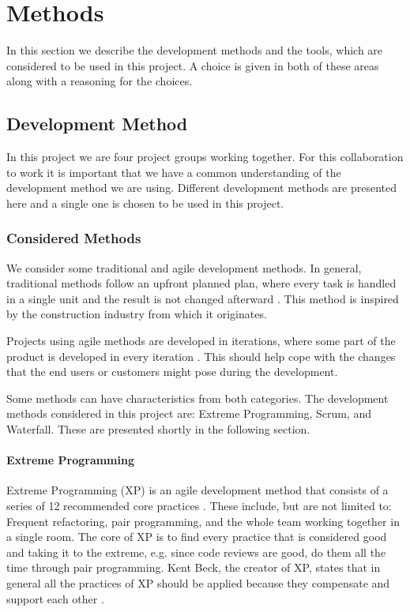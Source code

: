 \chapter{Methods}
In this section we describe the development methods and the tools, which are considered to be used in this project.
A choice is given in both of these areas along with a reasoning for the choices.

\section{Development Method}
\label{sec:devMethod}
In this project we are four project groups working together.
For this collaboration to work it is important that we have a common understanding of the development method we are using.
Different development methods are presented here and a single one is chosen to be used in this project.

\subsection{Considered Methods}
We consider some traditional and agile development methods. 
In general, traditional methods follow an upfront planned plan, where every task is handled in a single unit and the result is not changed afterward \cite[sec.~2.7]{Poppendieck00}.
This method is inspired by the construction industry from which it originates.

Projects using agile methods are developed in iterations, where some part of the product is developed in every iteration \cite[p.~25]{Larman04}.
This should help cope with the changes that the end users or customers might pose during the development.

Some methods can have characteristics from both categories.
The development methods considered in this project are: Extreme Programming, Scrum, and Waterfall.
These are presented shortly in the following section.

\subsubsection{Extreme Programming}
Extreme Programming (XP) is an agile development method that consists of a series of 12 recommended core practices \cite[p.~137]{Larman04}.
These include, but are not limited to: Frequent refactoring, pair programming, and the whole team working together in a single room.
The core of XP is to find every practice that is considered good and taking it to the extreme, e.g. since code reviews are good, do them all the time through pair programming.
Kent Beck, the creator of XP, states that in general all the practices of XP should be applied because they compensate and support each other \cite[p.~156-157]{Larman04}.

